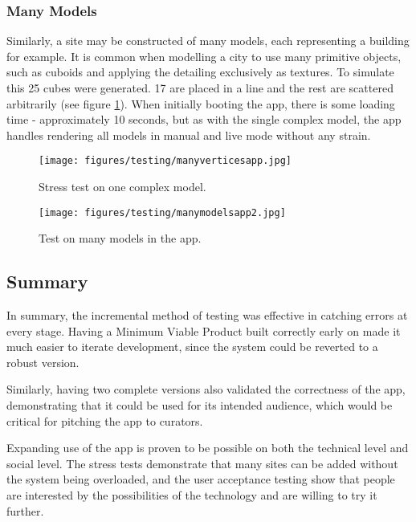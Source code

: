 \documentclass[12pt, a4paper]{article}
\begin{document}
\subsubsection{Many Models}
Similarly, a site may be constructed of many models, each representing a building for example. It is common when modelling a city to use many primitive objects, such as cuboids and applying the detailing exclusively as textures. To simulate this 25 cubes were generated. 17 are placed in a line and the rest are scattered arbitrarily (see figure \ref{fig:manymodelsapp}). When initially booting the app, there is some loading time - approximately 10 seconds, but as with the single complex model, the app handles rendering all models in manual and live mode without any strain. 

\begin{figure}[H]
\centering
\begin{minipage}{.5\textwidth}
  \centering
  \texttt{[image: figures/testing/manyverticesapp.jpg]}
    \caption{Stress test on one complex model.}
  \label{fig:manyverticesapp}
\end{minipage}%
\begin{minipage}{.5\textwidth}
  \centering
  \texttt{[image: figures/testing/manymodelsapp2.jpg]}
  \caption{Test on many models in the app.}
    \label{fig:manymodelsapp}
\end{minipage}
\end{figure}

\subsection{Summary}
In summary, the incremental method of testing was effective in catching errors at every stage. Having a Minimum Viable Product built correctly early on made it much easier to iterate development, since the system could be reverted to a robust version. 

Similarly, having two complete versions also validated the correctness of the app, demonstrating that it could be used for its intended audience, which would be critical for pitching the app to curators.

Expanding use of the app is proven to be possible on both the technical level and social level. The stress tests demonstrate that many sites can be added without the system being overloaded, and the user acceptance testing show that people are interested by the possibilities of the technology and are willing to try it further.
\end{document}
